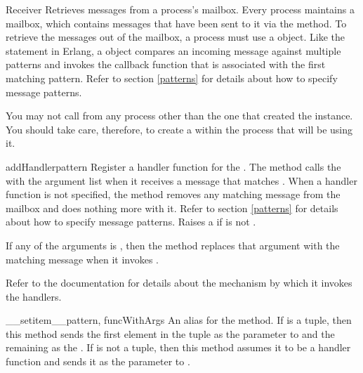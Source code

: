 \documentclass{howto}
\begin{document}
\begin{classdesc}{Receiver}{}
Retrieves messages from a process's mailbox. Every process maintains a mailbox,
which contains messages that have been sent to it via the 
method. To retrieve the messages out of the mailbox, a process must use a
 object. Like the  statement in Erlang, a
 object compares an incoming message against multiple patterns
and invokes the callback function that is associated with the first matching
pattern. Refer to section \ref{patterns} for details about how to specify
message patterns.

\begin{notice}[warning]
You may not call  from any process other than the
one that created the  instance. You should take care, therefore,
to create a  within the process that will be using it.
\end{notice}

\begin{methoddesc}{addHandler}{pattern}
Register a handler function  for the . The
 method calls the  with the  argument
list when it receives a message that matches . When a handler
function  is not specified, the  method removes any
matching message from the mailbox and does nothing more with it. Refer to
section \ref{patterns} for details about how to specify message patterns. Raises
a   if  is not
.

If any of the  arguments is , then the
 method replaces that argument with the matching message when
it invokes .

Refer to the  documentation for details about the
mechanism by which it invokes the handlers.
\end{methoddesc}

\begin{methoddesc}{__setitem__}{pattern, funcWithArgs}
\opindex{[]}
An alias for the  method. If  is a tuple,
then this method sends the first element in the tuple as the 
parameter to  and the remaining as the . If
 is not a tuple, then this method assumes it to be a handler
function and sends it as the  parameter to .


\end{methoddesc}
\end{classdesc}
\end{document}

